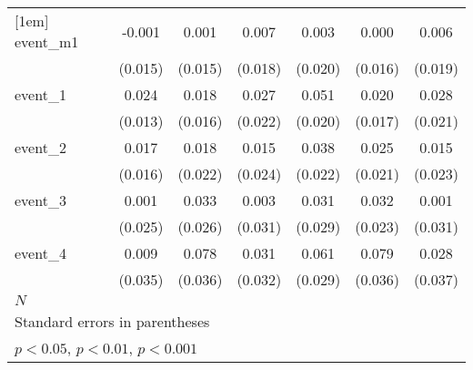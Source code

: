 {\begin{tabular}{l*{6}{c}}
[1em]
event\_m1    &      -0.001         &       0.001         &       0.007         &       0.003         &       0.000         &       0.006         \\
            &     (0.015)         &     (0.015)         &     (0.018)         &     (0.020)         &     (0.016)         &     (0.019)         \\
[1em]
event\_1     &       0.024         &       0.018         &       0.027         &       0.051\sym{*}  &       0.020         &       0.028         \\
            &     (0.013)         &     (0.016)         &     (0.022)         &     (0.020)         &     (0.017)         &     (0.021)         \\
[1em]
event\_2     &       0.017         &       0.018         &       0.015         &       0.038         &       0.025         &       0.015         \\
            &     (0.016)         &     (0.022)         &     (0.024)         &     (0.022)         &     (0.021)         &     (0.023)         \\
[1em]
event\_3     &       0.001         &       0.033         &       0.003         &       0.031         &       0.032         &       0.001         \\
            &     (0.025)         &     (0.026)         &     (0.031)         &     (0.029)         &     (0.023)         &     (0.031)         \\
[1em]
event\_4     &       0.009         &       0.078\sym{*}  &       0.031         &       0.061\sym{*}  &       0.079\sym{*}  &       0.028         \\
            &     (0.035)         &     (0.036)         &     (0.032)         &     (0.029)         &     (0.036)         &     (0.037)         \\
\hline
\(N\)       &                     &                     &                     &                     &                     &                     \\
\hline\hline
\multicolumn{7}{l}{\footnotesize Standard errors in parentheses}\\
\multicolumn{7}{l}{\footnotesize \sym{*} \(p<0.05\), \sym{**} \(p<0.01\), \sym{***} \(p<0.001\)}\\
\end{tabular}
}
